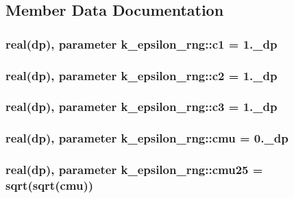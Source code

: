 \subsection{Member Data Documentation}
\hypertarget{classk__epsilon__rng_ad50599dfea881408b5cf48539f9ad517}{
\subsubsection[{c1}]{\setlength{\rightskip}{0pt plus 5cm}real(dp), parameter k\-\_\-epsilon\-\_\-rng\-::c1 = 1.\-\_\-dp}}\label{classk__epsilon__rng_ad50599dfea881408b5cf48539f9ad517}
\hypertarget{classk__epsilon__rng_a6a8f83178b54a12ab8bb88a8f87e4742}{
\subsubsection[{c2}]{\setlength{\rightskip}{0pt plus 5cm}real(dp), parameter k\-\_\-epsilon\-\_\-rng\-::c2 = 1.\-\_\-dp}}\label{classk__epsilon__rng_a6a8f83178b54a12ab8bb88a8f87e4742}
\hypertarget{classk__epsilon__rng_a60edd75f1fe3c0814506d06a17b7236a}{
\subsubsection[{c3}]{\setlength{\rightskip}{0pt plus 5cm}real(dp), parameter k\-\_\-epsilon\-\_\-rng\-::c3 = 1.\-\_\-dp}}\label{classk__epsilon__rng_a60edd75f1fe3c0814506d06a17b7236a}
\hypertarget{classk__epsilon__rng_a6b241c19c45ed08f9aa1f0a7e03b53d7}{
\subsubsection[{cmu}]{\setlength{\rightskip}{0pt plus 5cm}real(dp), parameter k\-\_\-epsilon\-\_\-rng\-::cmu = 0.\-\_\-dp}}\label{classk__epsilon__rng_a6b241c19c45ed08f9aa1f0a7e03b53d7}
\hypertarget{classk__epsilon__rng_ad5f3f150214e5954d1b25097db147625}{
\subsubsection[{cmu25}]{\setlength{\rightskip}{0pt plus 5cm}real(dp), parameter k\-\_\-epsilon\-\_\-rng\-::cmu25 = sqrt(sqrt({\bf cmu}))}}\label{classk__epsilon__rng_ad5f3f150214e5954d1b25097db147625}
